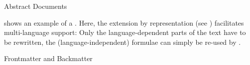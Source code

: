 \begin{omgroup}[id=omdoc-infrastructure,short=Document Infrastructure]
\begin{module}[id=docalt]
\begin{omgroup}{Abstract Documents}
\begin{example}
  {} shows an example of a {}. Here, the
  {\openmath} extension by {} representation (see {})
  facilitates multi-language support: Only the language-dependent parts of the text have
  to be rewritten, the (language-independent) formulae can simply be re-used by
  .
\end{example}
\end{omgroup}
\begin{omgroup}[id=docmatter]{Frontmatter and Backmatter}
\end{omgroup}
\end{module}
\end{omgroup}

